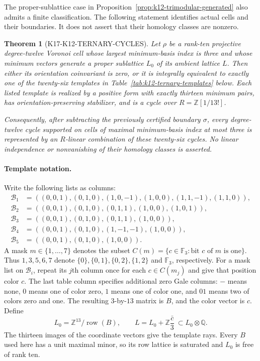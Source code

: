 \documentclass[11pt,a4paper]{article}
\newtheorem{theorem}{Theorem}[section]
\theoremstyle{definition}
\begin{document}
The proper-sublattice case in Proposition~\ref{prop:k12-trimodular-generated}
also admits a finite classification. The following statement identifies
actual cells and their boundaries. It does not assert that their homology
classes are nonzero.

\begin{theorem}[K17-K12-TERNARY-CYCLES]
\label{thm:k12-ternary-cycles}
Let $\rho$ be a rank-ten projective degree-twelve Voronoi cell whose
largest minimum-basis index is three and whose minimum vectors generate
a proper sublattice $L_0$ of its ambient lattice $L$.
Then either its orientation coinvariant is zero, or it is integrally
equivalent to exactly one of the twenty-six templates in
Table~\ref{tab:k12-ternary-templates} below. Each listed template is
realized by a positive form with exactly thirteen minimum pairs, has
orientation-preserving stabilizer, and is a cycle over
$R=\mathbb Z[1/13!]$.

Consequently, after subtracting the previously certified boundary
$\sigma$, every degree-twelve cycle supported on cells of maximal
minimum-basis index at most three is represented by an $R$-linear
combination of these twenty-six cycles. No linear independence or
nonvanishing of their homology classes is asserted.
\end{theorem}

\paragraph{Template notation.}
Write the following lists as columns:
\[
\begin{split}
\mathcal B_1&=((0,0,1),(0,1,0),(1,0,-1),(1,0,0),
                  (1,1,-1),(1,1,0)),\\
\mathcal B_2&=((0,0,1),(0,1,0),(0,1,1),(1,0,0),(1,0,1)),\\
\mathcal B_3&=((0,0,1),(0,1,0),(0,1,1),(1,0,0)),\\
\mathcal B_4&=((0,0,1),(0,1,0),(1,-1,-1),(1,0,0)),\\
\mathcal B_5&=((0,0,1),(0,1,0),(1,0,0)).
\end{split}                                                    \tag{TG.4}
\]
A mask $m\in\{1,\ldots,7\}$ denotes the subset
$C(m)=\{c\in\mathbb F_3:\text{bit }c\text{ of }m\text{ is one}\}$.
Thus $1,3,5,6,7$ denote $\{0\},\{0,1\},\{0,2\},\{1,2\}$
and $\mathbb F_3$, respectively.
For a mask list on $\mathcal B_i$, repeat its $j$th column once for
each $c\in C(m_j)$ and give that position color $c$.
The last table column specifies additional zero Gale columns:
$-$ means none, $0$ means one of color zero, $1$ means one of color
one, and $01$ means two of colors zero and one.
The resulting $3$-by-$13$ matrix is $B$, and the color vector is $c$.
Define
\[
 L_0=\mathbb Z^{13}/\operatorname{row}(B),\qquad
 L=L_0+\mathbb Z\frac{\bar c}{3}\ \subset L_0\otimes\mathbb Q.
                                                               \tag{TG.5}
\]
The thirteen images of the coordinate vectors give the template rays.
Every $B$ used here has a unit maximal minor, so its row lattice is
saturated and $L_0$ is free of rank ten.
\end{document}
